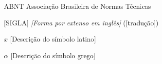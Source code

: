 \listoffigures*
\cleardoublepage

\listoftables*
\cleardoublepage

\begin{siglas}
	\item[ABNT] Associação Brasileira de Normas Técnicas
	\item[{[SIGLA]}] \textit{[Forma por extenso em inglês]} ([tradução])
\end{siglas}

\begin{simbolos}
	\item[$x$] [Descrição do símbolo latino]
	\item[$\alpha$] [Descrição do símbolo grego]
\end{simbolos}

\tableofcontents*
\cleardoublepage
